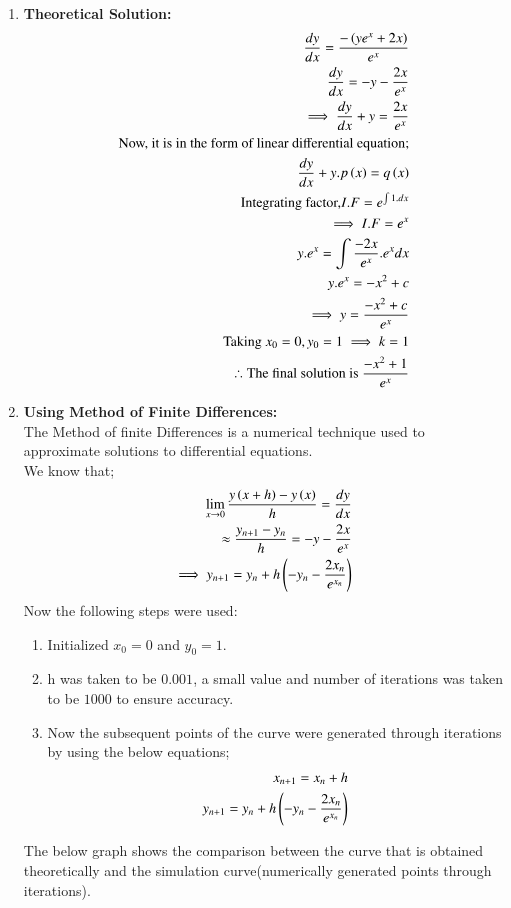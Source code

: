 \documentclass[journal]{IEEEtran}
\begin{document}
\begin{enumerate}
    \item \textbf{Theoretical Solution:}\\ 
    \begin{align}
    \frac{dy}{dx}=\frac{-\left(ye^x+2x\right)}{e^x}\\
    \frac{dy}{dx}=-y-\frac{2x}{e^x}\\
    \implies \frac{dy}{dx}+y=\frac{2x}{e^x}\\
    \text{Now, it is in the form of linear differential equation;}\\
    \frac{dy}{dx}+y.p\left(x\right)=q\left(x\right)\\
    \text{Integrating factor,} I.F=e^{\int1.dx}\\
    \implies I.F=e^x\\
    y.e^x=\int\frac{-2x}{e^x}.e^x dx\\
    y.e^x=-x^2+c\\
    \implies y=\frac{-x^2+c}{e^x}\\
    \text{Taking $x_0=0, y_0=1$}\implies k=1\\
    \therefore \text{The final solution is $\frac{-x^2+1}{e^x}$}
    \end{align}
    \item \textbf{Using Method of Finite Differences:}\\ The Method of finite Differences is a numerical technique used to approximate solutions to differential equations.\\We know that;\\
    \begin{align}
        \lim_{x\to 0}\frac{y\left(x+h\right)-y\left(x\right)}{h}=\frac{dy}{dx}\\
        \approx \frac{y_{n+1}-y_n}{h}=-y-\frac{2x}{e^x}\\
        \implies y_{n+1}=y_n+h\left(-y_n-\frac{2x_n}{e^{x_n}}\right)\\
    \end{align}
    Now the following steps were used:
    \begin{enumerate}
        \item Initialized $x_0=0$ and $y_0=1$.
        \item h was taken to be $0.001$, a small value and number of iterations was taken to be $1000$ to ensure accuracy.
        \item Now the subsequent points of the curve were generated through iterations by using the below equations;
        \begin{align}
            x_{n+1}=x_n+h\\
            y_{n+1}=y_n+h\left(-y_n-\frac{2x_n}{e^{x_n}}\right)
        \end{align}
    \end{enumerate}
    The below graph shows the comparison between the curve that is obtained theoretically and the simulation curve(numerically generated points through iterations).
\end{enumerate}
\end{document}
